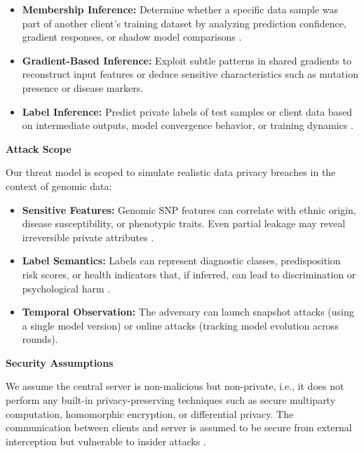 \documentclass[conference]{IEEEtran}
\begin{document}
\begin{itemize}
    \item \textbf{Membership Inference:} Determine whether a specific data sample was part of another client’s training dataset by analyzing prediction confidence, gradient responses, or shadow model comparisons \cite{bai2024membership4}\cite{suri2023subject7}.
    \item \textbf{Gradient-Based Inference:} Exploit subtle patterns in shared gradients to reconstruct input features or deduce sensitive characteristics such as mutation presence or disease markers\cite{driouich2022a32}\cite{momin2022generalized21}.
    \item \textbf{Label Inference:} Predict private labels of test samples or client data based on intermediate outputs, model convergence behavior, or training dynamics \cite{driouich2022a32}\cite{momin2022generalized21}.
\end{itemize}
\textbf{Attack Scope}


Our threat model is scoped to simulate realistic data privacy breaches in the context of genomic data:

\begin{itemize}
    \item \textbf{Sensitive Features:} Genomic SNP features can correlate with ethnic origin, disease susceptibility, or phenotypic traits. Even partial leakage may reveal irreversible private attributes \cite{momin2022generalized21}\cite{efficacy2024offederated10}.
    \item \textbf{Label Semantics:} Labels can represent diagnostic classes, predisposition risk scores, or health indicators that, if inferred, can lead to discrimination or psychological harm \cite{suri2023subject7}\cite{momin2022generalized21}.
    \item \textbf{Temporal Observation:} The adversary can launch snapshot attacks (using a single model version) or online attacks (tracking model evolution across rounds)\cite{Zhao_2025_29}\cite{driouich2022a32}.
\end{itemize}
\textbf{Security Assumptions}

We assume the central server is non-malicious but non-private, i.e., it does not perform any built-in privacy-preserving techniques such as secure multiparty computation, homomorphic encryption, or differential privacy. The communication between clients and server is assumed to be secure from external interception but vulnerable to insider attacks \cite{Zhao_2025_29}\cite{driouich2022a32}.
\end{document}
